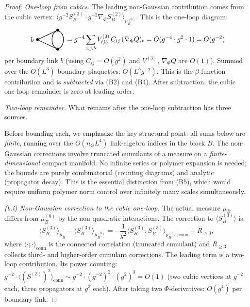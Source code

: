 \documentclass[11pt,a4paper]{article}
\theoremstyle{plain}
\theoremstyle{definition}
\theoremstyle{remark}
\begin{document}
\begin{proof}
\emph{One-loop from cubics.} The leading non-Gaussian
contribution comes from the cubic vertex:
$\langle g^{-2}S_B^{(3)}\cdot g^{-2}\nabla_\Phi S_B^{(2)}
\rangle_{\mu_B^{(0)}}$. This is the one-loop diagram:
\begin{equation}
  \vcenter{\hbox{%
    \begin{tikzpicture}[baseline=-0.5ex, scale=0.7]
      \tikzset{prop/.style={thick},
               vertex/.style={circle,fill,inner sep=1.5pt},
               bdy/.style={draw=none}}
      \node[vertex,label=left:{$b$}] (b) at (-1.5,0) {};
      \node[vertex] (v1) at (0,0.7) {};
      \node[vertex] (v2) at (0,-0.7) {};
      \draw[prop] (b) -- (v1);
      \draw[prop] (b) -- (v2);
      \draw[prop,bend left=60] (v1) to (v2);
      \draw[prop,bend right=60] (v1) to (v2);
    \end{tikzpicture}%
  }}
  = g^{-4}\sum_{i,j,b} V^{(3)}_{ijb}\,C_{ij}\,
  (\nabla_{\Phi} Q)_{b}
  = O(g^{-4}\cdot g^2 \cdot 1) = O(g^{-2})
\end{equation}
per boundary link $b$ (using $C_{ij} = O(g^2)$ and
$V^{(3)}$, $\nabla_\Phi Q$ are $O(1)$). Summed over
the $O(L^3)$ boundary plaquettes: $O(L^3 g^{-2})$.
This is the $\beta$-function contribution and is
\emph{subtracted} via (B2) and (B4). After subtraction,
the cubic one-loop remainder is zero at leading order.

\emph{Two-loop remainder.} What remains after the
one-loop subtraction has three sources.

Before bounding each, we emphasize the key structural
point: all sums below are \emph{finite}, running over
the $O(n_G L^4)$ link-algebra indices in the block $B$.
The non-Gaussian corrections involve truncated cumulants
of a measure on a \emph{finite-dimensional} compact
manifold. No infinite series or polymer expansion is
needed; the bounds are purely combinatorial (counting
diagrams) and analytic (propagator decay). This is the
essential distinction from (B5), which would require
uniform polymer norm control over infinitely many scales
simultaneously.

\textit{(b.i) Non-Gaussian correction to the cubic
one-loop.} The actual measure $\mu_B$ differs from
$\mu_B^{(0)}$ by the non-quadratic interactions. The
correction to $\langle S_B^{(3)} \rangle$ is:
\begin{equation}
  \langle S_B^{(3)}\rangle_{\mu_B}
  - \langle S_B^{(3)}\rangle_{\mu_B^{(0)}}
  = -\frac{1}{g^2}\langle S_B^{(3)};
  S_B^{(3)}\rangle_{\mu_B^{(0)},\mathrm{conn}}
  + R_{\ge 3},
\end{equation}
where $\langle\cdot;\cdot\rangle_{\mathrm{conn}}$
is the connected correlation (truncated cumulant)
and $R_{\ge 3}$ collects third- and higher-order
cumulant corrections. The leading term is a two-loop
contribution. Its power counting:
$g^{-2} \cdot \langle(S^{(3)})^2\rangle_{\mathrm{conn}}
\sim g^{-2}\cdot(g^{-2})^2\cdot(g^2)^3 = O(1)$
(two cubic vertices at $g^{-2}$ each, three propagators
at $g^2$ each). After taking two $\Phi$-derivatives:
$O(g^4)$ per boundary link.


\end{proof}
\end{document}
